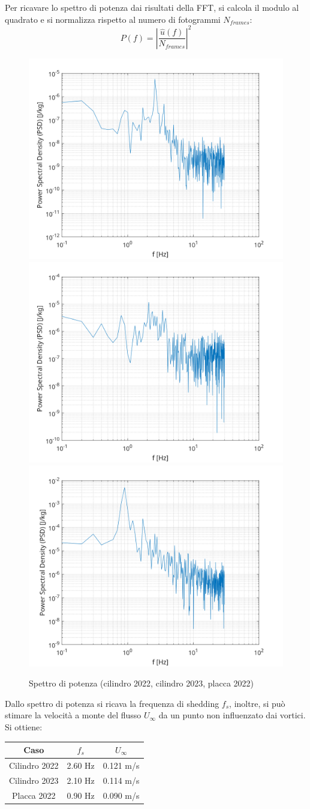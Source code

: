\noindent Per ricavare lo spettro di potenza dai risultati della FFT, si calcola il modulo al quadrato e si normalizza rispetto al numero di fotogrammi $N_{frames}$:
\begin{equation*}
    P(f) = \left| \frac{\hat u(f)}{N_{frames}} \right|^2
\end{equation*}
\begin{figure}[H]
    \centering
    \includegraphics[width=.49\textwidth]{images/11/PSD22.png}
    \includegraphics[width=.49\textwidth]{images/11/PSD23.png}
    \includegraphics[width=.55\textwidth]{images/11/PSD220.png}
    \caption{Spettro di potenza (cilindro 2022, cilindro 2023, placca 2022)}
\end{figure}

\noindent Dallo spettro di potenza si ricava la frequenza di shedding $f_s$, inoltre, si può stimare la velocità a monte del flusso $U_\infty$ da un punto non influenzato dai vortici. Si ottiene:
\begin{table}[H]
    \centering
    \begin{tabular}{|c|c|c|}
    \hline
    Caso          & $f_s$   & $U_\infty$ \\ \hline
    Cilindro 2022 & 2.60 Hz & 0.121 m/s  \\ \hline
    Cilindro 2023 & 2.10 Hz & 0.114 m/s  \\ \hline
    Placca 2022   & 0.90 Hz & 0.090 m/s  \\ \hline
    \end{tabular}
\end{table}

